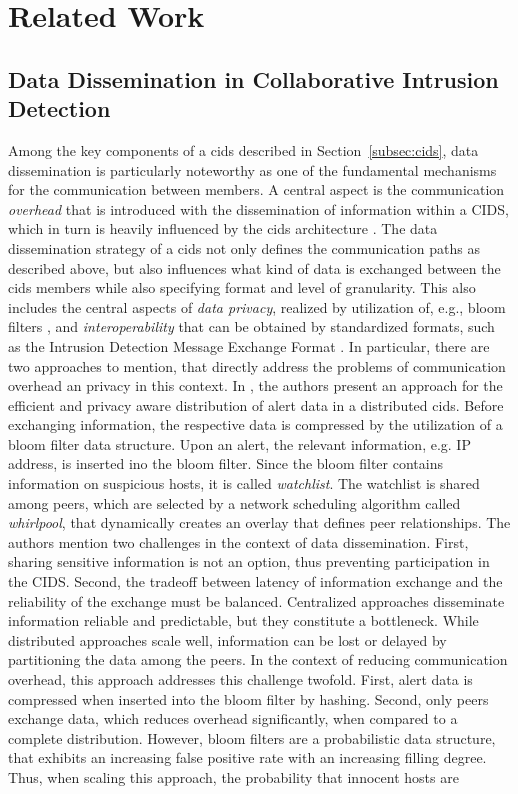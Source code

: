 \documentclass[../../main.tex]{subfiles}
\begin{document}
\chapter{Related Work}
\newpage
\section{Data Dissemination in Collaborative Intrusion Detection}

Among the key components of a \gls{cids} described in Section~\ref{subsec:cids}, data dissemination is particularly noteworthy as one of the fundamental mechanisms for the communication between members. A central aspect is the communication \textit{overhead} that is introduced with the dissemination of information within a CIDS, which in turn is heavily influenced by the \gls{cids} architecture \cite[p.39]{vasilomanolakis_collaborative_2016}. The data dissemination strategy of a \gls{cids}  not only defines the communication paths as described above, but also influences what kind of data is exchanged between the \gls{cids}  members while also specifying format and level of granularity. This also includes the central aspects of \textit{data privacy}, realized by utilization of, e.g., bloom filters \cite{Vasilomanolakis2015SkipMon}\cite{Locasto2005}, and \textit{interoperability} that can be obtained by standardized formats, such as the Intrusion Detection Message Exchange Format \cite{Cuppens2002}\cite{Duma2006}. In particular, there are two approaches to mention, that directly address the problems of communication overhead an privacy in this context. In \cite{Locasto2005}, the authors present an approach for the efficient and privacy aware distribution of alert data in a distributed \gls{cids}. Before exchanging information, the respective data is compressed by the utilization of a bloom filter data structure. Upon an alert, the relevant information, e.g. IP address, is inserted ino the bloom filter. Since the bloom filter contains information on suspicious hosts, it is called \textit{watchlist}. The watchlist is shared among peers, which are selected by a network scheduling algorithm called \textit{whirlpool}, that dynamically creates an overlay that defines peer relationships. The authors mention two challenges in the context of data dissemination. First, sharing sensitive information is not an option, thus preventing participation in the CIDS. Second, the tradeoff between latency of information exchange and the reliability of the exchange must be balanced. Centralized approaches disseminate information reliable and predictable, but they constitute a bottleneck. While distributed approaches scale well, information can be lost or delayed by partitioning the data among the peers. In the context of reducing communication overhead, this approach addresses this challenge twofold. First, alert data is compressed when inserted into the bloom filter by hashing. Second, only peers exchange data, which reduces overhead significantly, when compared to a complete distribution. However, bloom filters are a probabilistic data structure, that exhibits an increasing false positive rate with an increasing filling degree. Thus, when scaling this approach, the probability that innocent hosts are 
\end{document}
